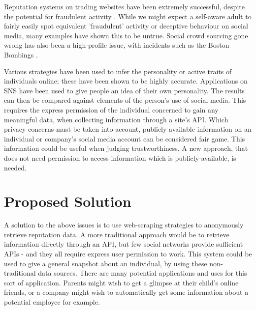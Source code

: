 Reputation systems on trading websites have been extremely successful, despite the potential for fraudulent activity \cite{resnick2002trust}. While we might expect a self-aware adult to fairly easily spot equivalent 'fraudulent' activity or deceptive behaviour on social media, many examples have shown this to be untrue. Social crowd sourcing gone wrong has also been a high-profile issue, with incidents such as the Boston Bombings \cite{crowdsourcing_wad,doan2011crowdsourcing,brabham2008crowdsourcing}.

Various strategies have been used to infer the personality or active traits of individuals online; these have been shown to be highly accurate. Applications on SNS have been used to give people an idea of their own personality. The results can then be compared against elements of the person's use of social media. This requires the express permission of the individual concerned to gain any meaningful data, when collecting information through a site's API. Which privacy concerns must be taken into account, publicly available information on an individual or company's social media account can be considered fair game. This information could be useful when judging trustworthiness. A new approach, that does not need permission to access information which is publicly-available, is needed. 

% 
% 

\section{Proposed Solution}
A solution to the above issues is to use web-scraping strategies to anonymously retrieve reputation data. A more traditional approach would be to retrieve information directly through an API, but few social networks provide sufficient APIs - and they all require express user permission to work. This system could be used to give a general snapshot about an individual, by using these non-traditional data sources. There are many potential applications and uses for this sort of application. Parents might wish to get a glimpse at their child's online friends, or a company might wish to automatically get some information about a potential employee for example.

